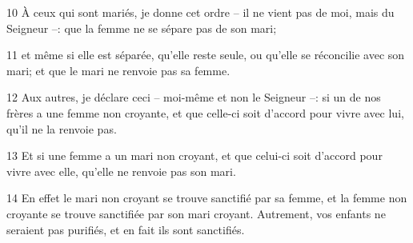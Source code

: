 
10 À ceux qui sont mariés, je donne cet ordre – il ne vient pas de moi, mais du Seigneur –: que la femme ne se sépare pas de son mari;

11 et même si elle est séparée, qu’elle reste seule, ou qu’elle se réconcilie avec son mari; et que le mari ne renvoie pas sa femme.

12 Aux autres, je déclare ceci – moi-même et non le Seigneur –: si un de nos frères a une femme non croyante, et que celle-ci soit d’accord pour vivre avec lui, qu’il ne la renvoie pas.

13 Et si une femme a un mari non croyant, et que celui-ci soit d’accord pour vivre avec elle, qu’elle ne renvoie pas son mari.

14 En effet le mari non croyant se trouve sanctifié par sa femme, et la femme non croyante se trouve sanctifiée par son mari croyant. Autrement, vos enfants ne seraient pas purifiés, et en fait ils sont sanctifiés.